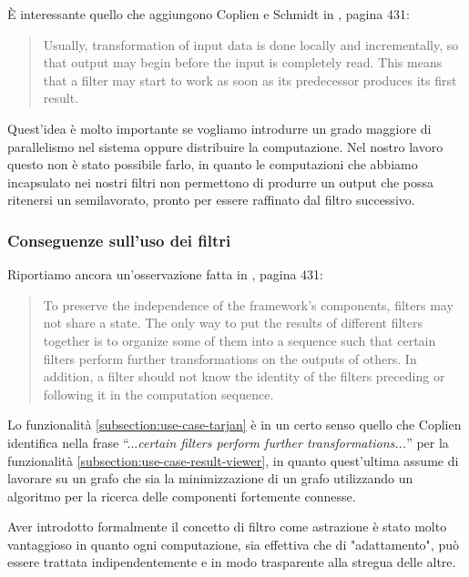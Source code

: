 \`E interessante quello che aggiungono Coplien e Schmidt in
\cite{PLOPD}, pagina 431:
\begin{quotation}
  Usually, transformation of input data is done locally and
  incrementally, so that output may begin before the input is
  completely read. This means that a filter may start to work as soon
  as its predecessor produces its first result.
\end{quotation}
Quest'idea \`e molto importante se vogliamo introdurre un grado
maggiore di parallelismo nel sistema oppure distribuire la
computazione. Nel nostro lavoro questo non \`e stato possibile farlo,
in quanto le computazioni che abbiamo incapsulato nei nostri filtri
non permettono di produrre un output che possa ritenersi un
semilavorato, pronto per essere raffinato dal filtro successivo.

\subsubsection{Conseguenze sull'uso dei filtri}
Riportiamo ancora un'osservazione fatta in \cite{PLOPD}, pagina 431:
\begin{quotation}
  To preserve the independence of the framework's components, filters
  may not share a state. The only way to put the results of different
  filters together is to organize some of them into a sequence such
  that certain filters perform further transformations on the outputs
  of others. In addition, a filter should not know the identity of the
  filters preceding or following it in the computation sequence.
\end{quotation}
Lo funzionalit\`a \ref{subsection:use-case-tarjan} \`e in un certo
senso quello che Coplien identifica nella frase ``...\emph{certain
  filters perform further transformations...}'' per la funzionalit\`a
\ref{subsection:use-case-result-viewer}, in quanto quest'ultima assume
di lavorare su un grafo che sia la minimizzazione di un grafo
utilizzando un algoritmo per la ricerca delle componenti fortemente
connesse.

Aver introdotto formalmente il concetto di filtro come astrazione \`e
stato molto vantaggioso in quanto ogni computazione, sia effettiva che
di "adattamento", pu\`o essere trattata indipendentemente e in modo
trasparente alla stregua delle altre.

